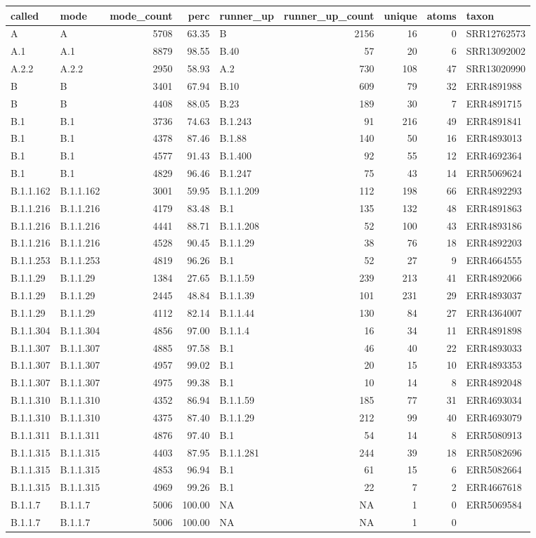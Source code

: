 \documentclass[
]{article}
\begin{document}
\begin{longtable}[]{@{}llrrlrrrl@{}}
\toprule
called & mode & mode\_count & perc & runner\_up & runner\_up\_count &
unique & atoms & taxon\tabularnewline
\midrule
\endhead
A & A & 5708 & 63.35 & B & 2156 & 16 & 0 & SRR12762573\tabularnewline
A.1 & A.1 & 8879 & 98.55 & B.40 & 57 & 20 & 6 &
SRR13092002\tabularnewline
A.2.2 & A.2.2 & 2950 & 58.93 & A.2 & 730 & 108 & 47 &
SRR13020990\tabularnewline
B & B & 3401 & 67.94 & B.10 & 609 & 79 & 32 & ERR4891988\tabularnewline
B & B & 4408 & 88.05 & B.23 & 189 & 30 & 7 & ERR4891715\tabularnewline
B.1 & B.1 & 3736 & 74.63 & B.1.243 & 91 & 216 & 49 &
ERR4891841\tabularnewline
B.1 & B.1 & 4378 & 87.46 & B.1.88 & 140 & 50 & 16 &
ERR4893013\tabularnewline
B.1 & B.1 & 4577 & 91.43 & B.1.400 & 92 & 55 & 12 &
ERR4692364\tabularnewline
B.1 & B.1 & 4829 & 96.46 & B.1.247 & 75 & 43 & 14 &
ERR5069624\tabularnewline
B.1.1.162 & B.1.1.162 & 3001 & 59.95 & B.1.1.209 & 112 & 198 & 66 &
ERR4892293\tabularnewline
B.1.1.216 & B.1.1.216 & 4179 & 83.48 & B.1 & 135 & 132 & 48 &
ERR4891863\tabularnewline
B.1.1.216 & B.1.1.216 & 4441 & 88.71 & B.1.1.208 & 52 & 100 & 43 &
ERR4893186\tabularnewline
B.1.1.216 & B.1.1.216 & 4528 & 90.45 & B.1.1.29 & 38 & 76 & 18 &
ERR4892203\tabularnewline
B.1.1.253 & B.1.1.253 & 4819 & 96.26 & B.1 & 52 & 27 & 9 &
ERR4664555\tabularnewline
B.1.1.29 & B.1.1.29 & 1384 & 27.65 & B.1.1.59 & 239 & 213 & 41 &
ERR4892066\tabularnewline
B.1.1.29 & B.1.1.29 & 2445 & 48.84 & B.1.1.39 & 101 & 231 & 29 &
ERR4893037\tabularnewline
B.1.1.29 & B.1.1.29 & 4112 & 82.14 & B.1.1.44 & 130 & 84 & 27 &
ERR4364007\tabularnewline
B.1.1.304 & B.1.1.304 & 4856 & 97.00 & B.1.1.4 & 16 & 34 & 11 &
ERR4891898\tabularnewline
B.1.1.307 & B.1.1.307 & 4885 & 97.58 & B.1 & 46 & 40 & 22 &
ERR4893033\tabularnewline
B.1.1.307 & B.1.1.307 & 4957 & 99.02 & B.1 & 20 & 15 & 10 &
ERR4893353\tabularnewline
B.1.1.307 & B.1.1.307 & 4975 & 99.38 & B.1 & 10 & 14 & 8 &
ERR4892048\tabularnewline
B.1.1.310 & B.1.1.310 & 4352 & 86.94 & B.1.1.59 & 185 & 77 & 31 &
ERR4693034\tabularnewline
B.1.1.310 & B.1.1.310 & 4375 & 87.40 & B.1.1.29 & 212 & 99 & 40 &
ERR4693079\tabularnewline
B.1.1.311 & B.1.1.311 & 4876 & 97.40 & B.1 & 54 & 14 & 8 &
ERR5080913\tabularnewline
B.1.1.315 & B.1.1.315 & 4403 & 87.95 & B.1.1.281 & 244 & 39 & 18 &
ERR5082696\tabularnewline
B.1.1.315 & B.1.1.315 & 4853 & 96.94 & B.1 & 61 & 15 & 6 &
ERR5082664\tabularnewline
B.1.1.315 & B.1.1.315 & 4969 & 99.26 & B.1 & 22 & 7 & 2 &
ERR4667618\tabularnewline
B.1.1.7 & B.1.1.7 & 5006 & 100.00 & NA & NA & 1 & 0 &
ERR5069584\tabularnewline
B.1.1.7 & B.1.1.7 & 5006 & 100.00 & NA & NA & 1 & 0 &

\end{longtable}
\end{document}
